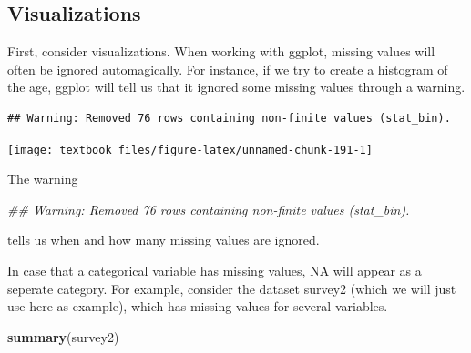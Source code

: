 \documentclass[]{tufte-book}
\newenvironment{Shaded}{}{}
\newcommand{\CommentTok}[1]{\textcolor[rgb]{0.38,0.63,0.69}{\textit{#1}}}
\newcommand{\DataTypeTok}[1]{\textcolor[rgb]{0.56,0.13,0.00}{#1}}
\newcommand{\DecValTok}[1]{\textcolor[rgb]{0.25,0.63,0.44}{#1}}
\newcommand{\KeywordTok}[1]{\textcolor[rgb]{0.00,0.44,0.13}{\textbf{#1}}}
\newcommand{\NormalTok}[1]{#1}
\newcommand{\OperatorTok}[1]{\textcolor[rgb]{0.40,0.40,0.40}{#1}}
\newcommand{\StringTok}[1]{\textcolor[rgb]{0.25,0.44,0.63}{#1}}
\begin{document}
\hypertarget{visualizations}{%
\subsection{Visualizations}\label{visualizations}}

First, consider visualizations. When working with ggplot, missing values will often be ignored automagically. For instance, if we try to create a histogram of the age, ggplot will tell us that it ignored some missing values through a warning.

\begin{Shaded}
\end{Shaded}

\begin{verbatim}
## Warning: Removed 76 rows containing non-finite values (stat_bin).
\end{verbatim}

\texttt{[image: textbook\_files/figure-latex/unnamed-chunk-191-1]}

The warning

\begin{Shaded}
\begin{Highlighting}[]
\CommentTok{## Warning: Removed 76 rows containing non-finite values (stat_bin).}
\end{Highlighting}
\end{Shaded}

tells us when and how many missing values are ignored.

In case that a categorical variable has missing values, NA will appear as a seperate category. For example, consider the dataset survey2 (which we will just use here as example), which has missing values for several variables.

\begin{Shaded}
\begin{Highlighting}[]
\KeywordTok{summary}\NormalTok{(survey2)}
\end{Highlighting}
\end{Shaded}
\end{document}
